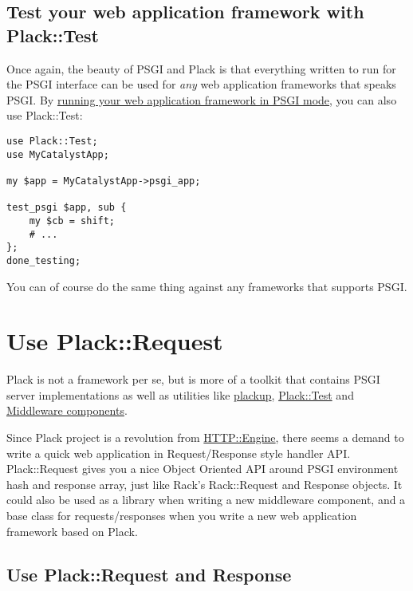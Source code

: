\section{Test your web application framework with
Plack::Test}\label{test-your-web-application-framework-with-placktest}

Once again, the beauty of PSGI and Plack is that everything written to
run for the PSGI interface can be used for \emph{any} web application
frameworks that speaks PSGI. By
\href{http://advent.plackperl.org/2009/12/day-7-use-web-application-framework-in-psgi.html}{running
your web application framework in PSGI mode}, you can also use
Plack::Test:

\begin{lstlisting}
use Plack::Test;
use MyCatalystApp;

my $app = MyCatalystApp->psgi_app;

test_psgi $app, sub {
    my $cb = shift;
    # ...
};
done_testing;
\end{lstlisting}

You can of course do the same thing against any frameworks that supports
PSGI.

\chapter{Use Plack::Request}\label{day-14-use-plackrequest}

Plack is not a framework per se, but is more of a toolkit that contains
PSGI server implementations as well as utilities like
\href{http://advent.plackperl.org/2009/12/day-3-using-plackup.html}{plackup},
\href{http://advent.plackperl.org/2009/12/day-13-use-placktest-to-test-your-application.html}{Plack::Test}
and
\href{http://advent.plackperl.org/2009/12/day-10-using-plack-middleware.html}{Middleware
components}.

Since Plack project is a revolution from
\href{http://search.cpan.org/perldoc?HTTP::Engine}{HTTP::Engine}, there
seems a demand to write a quick web application in Request/Response
style handler API. Plack::Request gives you a nice Object Oriented API
around PSGI environment hash and response array, just like Rack's
Rack::Request and Response objects. It could also be used as a library
when writing a new middleware component, and a base class for
requests/responses when you write a new web application framework based
on Plack.

\section{Use Plack::Request and
Response}\label{use-plackrequest-and-response}

